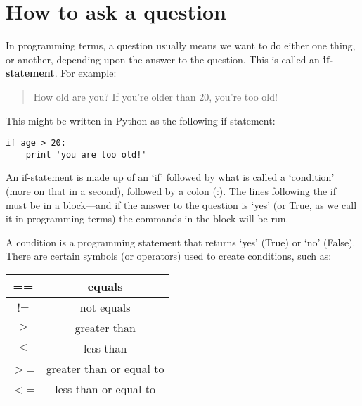 

\chapter{How to ask a question}\label{ch:howtoaskaquestion}

In programming terms, a question usually means we want to do either one thing, or another, depending upon the answer to the question.  This is called an \textbf{if-statement}.  For example:

\begin{quotation}
How old are you?  If you're older than 20, you're too old!
\end{quotation}

This might be written in Python as the following if-statement:

\begin{listing}
\begin{verbatim}
if age > 20:
    print 'you are too old!'
\end{verbatim}
\end{listing}

An if-statement is made up of an `if' followed by what is called a `condition' (more on that in a second), followed by a colon (:).  The lines following the if must be in a block---and if the answer to the question is `yes' (or True, as we call it in programming terms) the commands in the block will be run.
\par
A condition is a programming statement that returns `yes' (True) or `no' (False).  There are certain symbols (or operators) used to create conditions, such as:

\begin{center}
\begin{tabular}{|c|c|}
\hline
== & equals \\
\hline
!= & not equals \\
\hline
$>$ & greater than \\
\hline
$<$ & less than \\
\hline
$>$= & greater than or equal to \\
\hline
$<$= & less than or equal to \\
\hline
\end{tabular}
\end{center}

